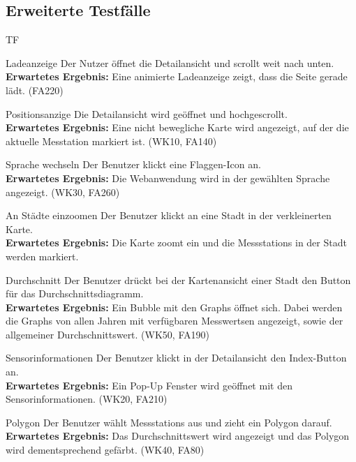 \subsection{Erweiterte Testfälle}
\begin{Kriterien}{TF}

	\item[Ladeanzeige] Der Nutzer öffnet die  \gls{Detailansicht} und scrollt weit nach unten. \\ \textbf{Erwartetes Ergebnis:} Eine animierte Ladeanzeige zeigt, dass die Seite gerade lädt. (FA220)

	\item[Positionsanzige] Die Detailansicht wird geöffnet und hochgescrollt. \\ \textbf{Erwartetes Ergebnis:} Eine nicht bewegliche Karte wird angezeigt, auf der die aktuelle \gls{Messtation} markiert ist. (WK10, FA140)
	
	\item[Sprache wechseln] Der Benutzer klickt eine Flaggen-Icon an. \\ \textbf{Erwartetes Ergebnis:} Die Webanwendung wird in der gewählten Sprache angezeigt. (WK30, FA260) 
	
	\item[An Städte einzoomen] Der Benutzer klickt an eine Stadt in der verkleinerten Karte. \\ \textbf{Erwartetes Ergebnis:} Die Karte zoomt ein und die \glspl{Messstation} in der Stadt werden markiert.
	
	\item[Durchschnitt] Der Benutzer drückt bei der Kartenansicht einer Stadt den Button für das Durchschnittsdiagramm. \\ \textbf{Erwartetes Ergebnis:} Ein Bubble mit den \glspl{Graph} öffnet sich. Dabei werden die \glspl{Graph} von allen Jahren mit verfügbaren \glspl{Messwert}en angezeigt, sowie der allgemeiner Durchschnittswert. (WK50, FA190)
	
	\item[Sensorinformationen] Der Benutzer klickt in der Detailansicht den Index-Button an. \\ \textbf{Erwartetes Ergebnis:}  Ein Pop-Up Fenster
    wird geöffnet mit den Sensorinformationen. (WK20, FA210)

    \item[Polygon] Der Benutzer wählt \glspl{Messstation} aus und zieht ein Polygon darauf. \\ \textbf{Erwartetes Ergebnis:} Das Durchschnittswert wird angezeigt und das Polygon wird dementsprechend gefärbt. (WK40, FA80)
	

\end{Kriterien}
